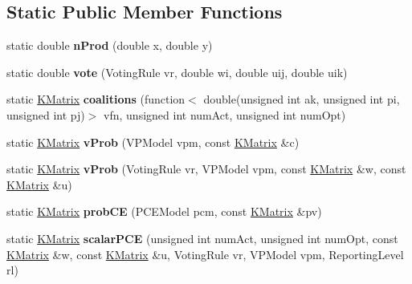 \subsection*{Static Public Member Functions}
\begin{DoxyCompactItemize}
\item 
\hypertarget{class_k_base_1_1_model_a9bcd9a07fc288091d13d662e171390d3}{static double {\bfseries n\-Prod} (double x, double y)}\label{class_k_base_1_1_model_a9bcd9a07fc288091d13d662e171390d3}

\item 
\hypertarget{class_k_base_1_1_model_a7816a87892ced9fa979d76954da13b8c}{static double {\bfseries vote} (Voting\-Rule vr, double wi, double uij, double uik)}\label{class_k_base_1_1_model_a7816a87892ced9fa979d76954da13b8c}

\item 
\hypertarget{class_k_base_1_1_model_a988856a6236fa8312c04a03168d57f50}{static \hyperlink{class_k_base_1_1_k_matrix}{K\-Matrix} {\bfseries coalitions} (function$<$ double(unsigned int ak, unsigned int pi, unsigned int pj)$>$ vfn, unsigned int num\-Act, unsigned int num\-Opt)}\label{class_k_base_1_1_model_a988856a6236fa8312c04a03168d57f50}

\item 
\hypertarget{class_k_base_1_1_model_a440319f89298fba52901e435a3153a57}{static \hyperlink{class_k_base_1_1_k_matrix}{K\-Matrix} {\bfseries v\-Prob} (V\-P\-Model vpm, const \hyperlink{class_k_base_1_1_k_matrix}{K\-Matrix} \&c)}\label{class_k_base_1_1_model_a440319f89298fba52901e435a3153a57}

\item 
\hypertarget{class_k_base_1_1_model_a3f34db18c88892cd4db03e3c019e78c5}{static \hyperlink{class_k_base_1_1_k_matrix}{K\-Matrix} {\bfseries v\-Prob} (Voting\-Rule vr, V\-P\-Model vpm, const \hyperlink{class_k_base_1_1_k_matrix}{K\-Matrix} \&w, const \hyperlink{class_k_base_1_1_k_matrix}{K\-Matrix} \&u)}\label{class_k_base_1_1_model_a3f34db18c88892cd4db03e3c019e78c5}

\item 
\hypertarget{class_k_base_1_1_model_a352b8be7b7bb6814e990dcedc08df8da}{static \hyperlink{class_k_base_1_1_k_matrix}{K\-Matrix} {\bfseries prob\-C\-E} (P\-C\-E\-Model pcm, const \hyperlink{class_k_base_1_1_k_matrix}{K\-Matrix} \&pv)}\label{class_k_base_1_1_model_a352b8be7b7bb6814e990dcedc08df8da}

\item 
\hypertarget{class_k_base_1_1_model_aa2a04e5142714ee3194fd8656cdffbc4}{static \hyperlink{class_k_base_1_1_k_matrix}{K\-Matrix} {\bfseries scalar\-P\-C\-E} (unsigned int num\-Act, unsigned int num\-Opt, const \hyperlink{class_k_base_1_1_k_matrix}{K\-Matrix} \&w, const \hyperlink{class_k_base_1_1_k_matrix}{K\-Matrix} \&u, Voting\-Rule vr, V\-P\-Model vpm, Reporting\-Level rl)}\label{class_k_base_1_1_model_aa2a04e5142714ee3194fd8656cdffbc4}


\end{DoxyCompactItemize}
